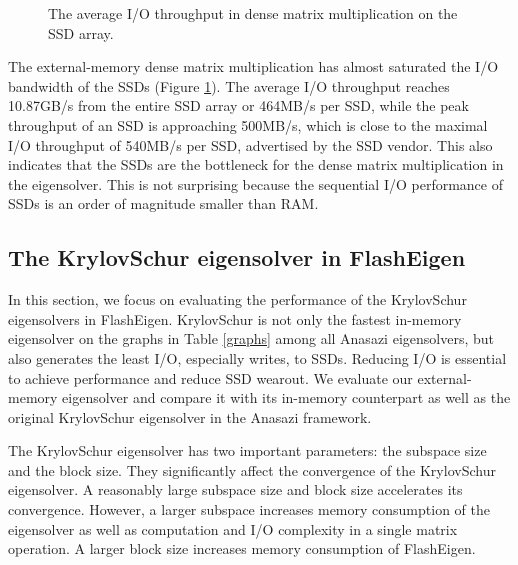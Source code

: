 %		

\begin{figure}
	\begin{center}
		\footnotesize
		\vspace{-15pt}
		
		\vspace{-15pt}
		\caption{The average I/O throughput in dense matrix multiplication
		on the SSD array.}
		\label{perf:dmm_io}
	\end{center}
\end{figure}

The external-memory dense matrix multiplication has almost saturated
the I/O bandwidth of the SSDs (Figure \ref{perf:dmm_io}). The average
I/O throughput reaches 10.87GB/s from the entire SSD array or 464MB/s
per SSD, while the peak throughput of an SSD is approaching 500MB/s,
which is close to the maximal I/O throughput of 540MB/s per SSD, advertised by
the SSD vendor. This also indicates that the SSDs are the bottleneck for
the dense matrix multiplication in the eigensolver. This is not
surprising because the sequential I/O performance of SSDs is an order of
magnitude smaller than RAM. 

\subsection{The KrylovSchur eigensolver in FlashEigen}
In this section, we focus on evaluating the performance of the KrylovSchur
eigensolvers in FlashEigen. KrylovSchur is not only the fastest in-memory
eigensolver on the graphs in Table \ref{graphs} among all Anasazi eigensolvers,
but also generates the least I/O, especially writes,
to SSDs. Reducing I/O is essential to achieve performance and reduce SSD
wearout. We evaluate our external-memory eigensolver and compare it
with its in-memory counterpart as well as the original KrylovSchur eigensolver
in the Anasazi framework.

The KrylovSchur eigensolver has two important parameters: the subspace size
and the block size. They significantly affect the convergence of
the KrylovSchur eigensolver. A reasonably large subspace size and block size
accelerates its convergence. However, a larger subspace increases memory
consumption of the eigensolver as well as computation and I/O complexity
in a single matrix operation. A larger block size increases memory consumption
of FlashEigen.

